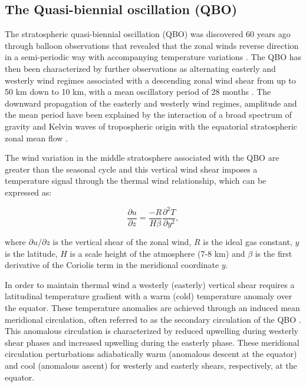 
\subsection{The Quasi-biennial oscillation (QBO)}

The stratospheric quasi-biennial oscillation (QBO) was discovered 60 years ago through balloon observations  that revealed that the zonal winds reverse direction in a semi-periodic way with accompanying temperature variations \citep{ebdon1960,reed1964}. The QBO has then been characterized by further observations as alternating easterly and westerly wind regimes associated with a descending zonal wind shear from up to 50 km down to 10 km, with a mean oscillatory period of 28 months \citep{baldwin2001}. 
The downward propagation of the easterly and westerly wind regimes, amplitude and the mean period have been explained by the interaction of a broad spectrum of gravity and Kelvin waves of tropospheric origin with the equatorial stratospheric zonal mean flow  \citep{baldwin2001}.

The wind variation in the middle stratosphere associated with the QBO are greater than the seasonal cycle \citep{andrews1987} and this vertical wind shear imposes a temperature signal through the thermal wind relationship, which can be expressed as: 

\begin{equation}
\frac{\partial{u}}{\partial{z}}=\frac{-R}{H \beta}\frac{\partial^2 T}{\partial y^2}, 
\end{equation}

\noindent where $\partial u / \partial z$ is the vertical shear of the zonal wind, $R$ is the ideal gas constant, $y$ is the latitude, $H$ is a scale height of the atmosphere (7-8 km) and $\beta$ is the first derivative of the Coriolis term in the meridional coordinate $y$. 

In order to maintain thermal wind a westerly (easterly) vertical shear requires a latitudinal temperature gradient with a warm (cold) temperature anomaly over the equator. These temperature anomalies are achieved through an induced mean meridional circulation, often referred to as the secondary circulation of the QBO \citep{plumb1982,li1995,baldwin2001,ribera2004}. This anomalous circulation is characterized by reduced upwelling during westerly shear phases and increased upwelling during the easterly phase. These meridional circulation perturbations adiabatically warm (anomalous descent at the equator) and cool (anomalous ascent) for westerly and easterly shears, respectively, at the equator. 

